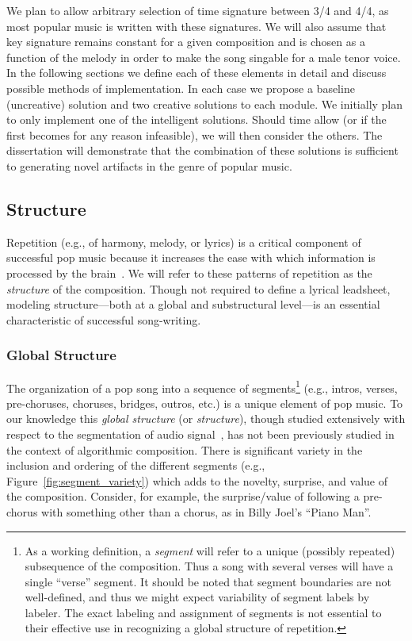 \documentclass[11pt,phd]{byuprop}
\begin{document}
We plan to allow arbitrary selection of time signature between 3/4 and 4/4, as most popular music is written with these signatures. We will also assume that key signature remains constant for a given composition and is chosen as a function of the melody in order to make the song singable for a male tenor voice. In the following sections we define each of these elements in detail and discuss possible methods of implementation. In each case we propose a baseline (uncreative) solution and two creative solutions to each module. We initially plan to only implement one of the intelligent solutions. Should time allow (or if the first becomes for any reason infeasible), we will then consider the others. The dissertation will demonstrate that the combination of these solutions is sufficient to generating novel artifacts in the genre of popular music.

\subsection{Structure}

Repetition (e.g., of harmony, melody, or lyrics) is a critical component of successful pop music because it increases the ease with which information is processed by the brain~\cite{nunes2015power}.  We will refer to these patterns of repetition as the \emph{structure} of the composition. Though not required to define a lyrical leadsheet, modeling structure---both at a global and substructural level---is an essential characteristic of successful song-writing. 

\subsubsection{Global Structure}

The organization of a pop song into a sequence of segments\footnote{As a working definition, a \emph{segment} will refer to a unique (possibly repeated) subsequence of the composition. Thus a song with several verses will have a single ``verse'' segment. It should be noted that segment boundaries are not well-defined, and thus we might expect variability of segment labels by labeler. The exact labeling and assignment of segments is not essential to their effective use in recognizing a global structure of repetition.} (e.g., intros, verses, pre-choruses, choruses, bridges, outros, etc.) is a unique element of pop music. To our knowledge this \emph{global structure} (or \emph{structure}), though studied extensively with respect to the segmentation of audio signal~\cite{foote2000automatic}, has not been previously studied in the context of algorithmic composition. There is significant variety in the inclusion and ordering of the different segments (e.g., Figure~\ref{fig:segment_variety}) which adds to the novelty, surprise, and value of the composition. Consider, for example, the surprise/value of following a pre-chorus with something other than a chorus, as in Billy Joel's ``Piano Man''.
\end{document}
